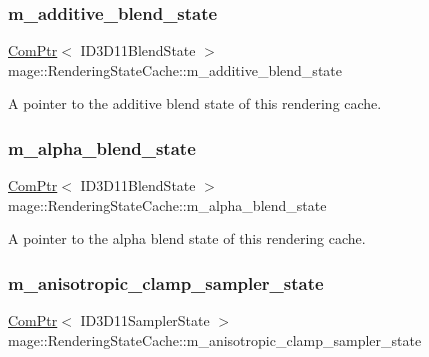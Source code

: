 \subsubsection{\texorpdfstring{m\+\_\+additive\+\_\+blend\+\_\+state}{m\_additive\_blend\_state}}
{\footnotesize\ttfamily \hyperlink{namespacemage_ae74f374780900893caa5555d1031fd79}{Com\+Ptr}$<$ I\+D3\+D11\+Blend\+State $>$ mage\+::\+Rendering\+State\+Cache\+::m\+\_\+additive\+\_\+blend\+\_\+state\hspace{0.3cm}{\ttfamily [private]}}

A pointer to the additive blend state of this rendering cache. \hypertarget{structmage_1_1_rendering_state_cache_a4eda3c0aeeaca45e4e07358267bb8ae6}{}\label{structmage_1_1_rendering_state_cache_a4eda3c0aeeaca45e4e07358267bb8ae6} 
\subsubsection{\texorpdfstring{m\+\_\+alpha\+\_\+blend\+\_\+state}{m\_alpha\_blend\_state}}
{\footnotesize\ttfamily \hyperlink{namespacemage_ae74f374780900893caa5555d1031fd79}{Com\+Ptr}$<$ I\+D3\+D11\+Blend\+State $>$ mage\+::\+Rendering\+State\+Cache\+::m\+\_\+alpha\+\_\+blend\+\_\+state\hspace{0.3cm}{\ttfamily [private]}}

A pointer to the alpha blend state of this rendering cache. \hypertarget{structmage_1_1_rendering_state_cache_a56467ab3877bfb1fa547efe4e4a62cc7}{}\label{structmage_1_1_rendering_state_cache_a56467ab3877bfb1fa547efe4e4a62cc7} 
\subsubsection{\texorpdfstring{m\+\_\+anisotropic\+\_\+clamp\+\_\+sampler\+\_\+state}{m\_anisotropic\_clamp\_sampler\_state}}
{\footnotesize\ttfamily \hyperlink{namespacemage_ae74f374780900893caa5555d1031fd79}{Com\+Ptr}$<$ I\+D3\+D11\+Sampler\+State $>$ mage\+::\+Rendering\+State\+Cache\+::m\+\_\+anisotropic\+\_\+clamp\+\_\+sampler\+\_\+state\hspace{0.3cm}{\ttfamily [private]}}

